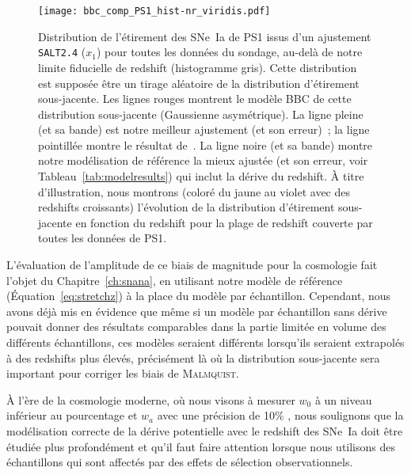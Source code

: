 \documentclass[../main/main.tex]{subfiles}
\begin{document}
\begin{SCfigure}[1]
    \texttt{[image: bbc\_comp\_PS1\_hist-nr\_viridis.pdf]}
    \caption[Comparaison des modélisations de BBC et de notre modèle de
    référence sur l'histogramme des étirements de PS1]{\scriptsize Distribution de
        l'étirement des SNe~Ia de PS1 issus d'un ajustement \texttt{SALT2.4}
        ($x_1$) pour toutes les données du sondage, au-delà de notre limite
        fiducielle de redshift (histogramme gris). Cette distribution est
        supposée être un tirage aléatoire de la distribution d'étirement
        sous-jacente. Les lignes rouges montrent le modèle BBC de cette
        distribution sous-jacente (Gaussienne asymétrique). La ligne pleine (et
        sa bande) est notre meilleur ajustement (et son erreur)~; la ligne
        pointillée montre le résultat de~\cite{scolnic2018}. La ligne noire (et
        sa bande) montre notre modélisation de référence la mieux ajustée (et
        son erreur, voir Tableau~\ref{tab:modelresults}) qui inclut la dérive du
        redshift. À titre d'illustration, nous montrons (coloré du jaune au
        violet avec des redshifts croissants) l'évolution de la distribution
        d'étirement sous-jacente en fonction du redshift pour la plage de
    redshift couverte par toutes les données de PS1.}
    \label{fig:bbc_pdf_ps1}
\end{SCfigure}

L'évaluation de l'amplitude de ce biais de magnitude pour la cosmologie fait
l'objet du Chapitre~\ref{ch:snana}, en utilisant notre modèle de référence
(Équation~\ref{eq:stretchz}) à la place du modèle par échantillon. Cependant,
nous avons déjà mis en évidence que même si un modèle par échantillon sans
dérive pouvait donner des résultats comparables dans la partie limitée en volume
des différents échantillons, ces modèles seraient différents lorsqu'ils
seraient extrapolés à des redshifts plus élevés, précisément là où la
distribution sous-jacente sera important pour corriger les biais de
\textsc{Malmquist}.

À l'ère de la cosmologie moderne, où nous visons à mesurer $w_0$ à un niveau
inférieur au pourcentage et $w_a$ avec une précision de 10\% \citep[par
exemple,][]{ivezic2019}, nous soulignons que la modélisation correcte de la
dérive potentielle avec le redshift des SNe~Ia doit être étudiée plus
profondément et qu'il faut faire attention lorsque nous utilisons des
échantillons qui sont affectés par des effets de sélection observationnels.
\end{document}
